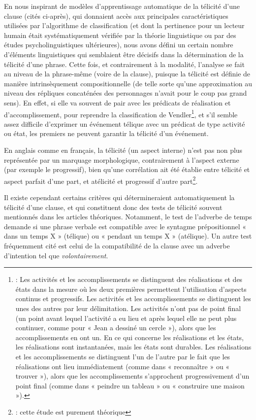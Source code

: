 En nous inspirant de modèles d'apprentissage automatique de la télicité d'une clause (cités ci-après), qui donnaient accès aux principales caractéristiques utilisées par l'algorithme de classification (et dont la pertinence pour un lecteur humain était systématiquement vérifiée par la théorie linguistique ou par des études psycholinguistiques ultérieures), nous avons défini un certain nombre d'éléments linguistiques qui semblaient être décisifs dans la détermination de la télicité d'une phrase. Cette fois, et contrairement à la modalité, l'analyse se fait au niveau de la phrase-même (voire de la clause), puisque la télicité est définie de manière intrinsèquement compositionnelle (de telle sorte qu'une approximation au niveau des répliques concaténées des personnages n’avait pour le coup pas grand sens). En effet, si elle va souvent de pair avec les prédicats de réalisation et d'accomplissement, pour reprendre la classification de Vendler\footnote{\cite{vendler_verbs_nodate}: Les activités et les accomplissements se distinguent des réalisations et des états dans la mesure où les deux premières permettent l'utilisation d'aspects continus et progressifs. Les activités et les accomplissements se distinguent les unes des autres par leur délimitation. Les activités n'ont pas de point final (un point avant lequel l'activité a eu lieu et après lequel elle ne peut plus continuer, comme pour « Jean a dessiné un cercle »), alors que les accomplissements en ont un. En ce qui concerne les réalisations et les états, les réalisations sont instantanées, mais les états sont durables. Les réalisations et les accomplissements se distinguent l'un de l'autre par le fait que les réalisations ont lieu immédiatement (comme dans « reconnaître » ou « trouver »), alors que les accomplissements s'approchent progressivement d'un point final (comme dans « peindre un tableau » ou « construire une maison »).}, et s’il semble assez difficile d'exprimer un événement télique avec un prédicat de type activité ou état, les premiers ne peuvent garantir la télicité d'un événement.

En anglais comme en français, la télicité (un aspect interne) n'est pas non plus représentée par un marquage morphologique, contrairement à l'aspect externe (par exemple le progressif), bien qu'une corrélation ait été établie entre télicité et aspect parfait d'une part, et atélicité et progressif d'autre part\footnote{\cite{frawley_linguistic_1992}: cette étude est purement théorique}.

Il existe cependant certains critères qui détermineraient automatiquement la télicité d'une clause, et qui constituent donc des tests de télicité souvent mentionnés dans les articles théoriques. Notamment, le test de l'adverbe de temps demande si une phrase verbale est compatible avec le syntagme prépositionnel « dans un temps X » (télique) ou « pendant un temps X » (atélique). Un autre test fréquemment cité est celui de la compatibilité de la clause avec un adverbe d'intention tel que \textit{volontairement}.

